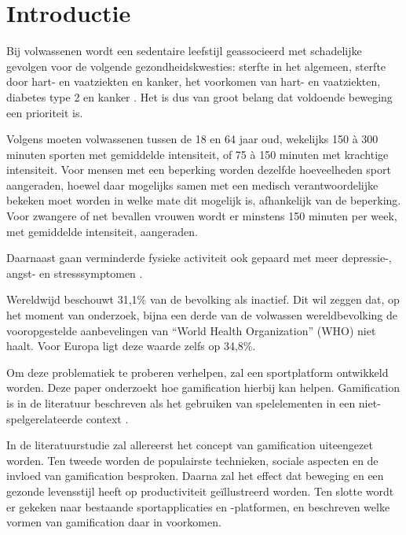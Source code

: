 
\section{Introductie}%
\label{sec:introductie}

Bij volwassenen wordt een sedentaire leefstijl geassocieerd met schadelijke gevolgen voor de volgende gezondheidskwesties: sterfte in het algemeen, sterfte door hart- en vaatziekten en kanker, het voorkomen van hart- en vaatziekten, diabetes type 2 en kanker \autocite{Bull2020}. Het is dus van groot belang dat voldoende beweging een prioriteit is.

Volgens \textcite{Bull2020} moeten volwassenen tussen de 18 en 64 jaar oud, wekelijks 150 à 300 minuten sporten met gemiddelde intensiteit, of 75 à 150 minuten met krachtige intensiteit. Voor mensen met een beperking worden dezelfde hoeveelheden sport aangeraden, hoewel daar mogelijks samen met een medisch verantwoordelijke bekeken moet worden in welke mate dit mogelijk is, afhankelijk van de beperking. Voor zwangere of net bevallen vrouwen wordt er minstens 150 minuten per week, met gemiddelde intensiteit, aangeraden.

Daarnaast gaan verminderde fysieke activiteit ook gepaard met meer depressie-, angst- en stresssymptomen \autocite{Stanton2020}.

Wereldwijd beschouwt \autocite{Hallal2012} 31,1\% van de bevolking als inactief. Dit wil zeggen dat, op het moment van onderzoek, bijna een derde van de volwassen wereldbevolking de vooropgestelde aanbevelingen van ``World Health Organization'' (WHO) niet haalt. Voor Europa ligt deze waarde zelfs op 34,8\%.

Om deze problematiek te proberen verhelpen, zal een sportplatform ontwikkeld worden. Deze paper onderzoekt hoe gamification hierbij kan helpen. Gamification is in de literatuur beschreven als het gebruiken van spelelementen in een niet-spelgerelateerde context \autocite{Gaalen2020}.


In de literatuurstudie zal allereerst het concept van gamification uiteengezet worden. Ten tweede worden de populairste technieken, sociale aspecten en de invloed van gamification besproken. Daarna zal het effect dat beweging en een gezonde levensstijl heeft op productiviteit geïllustreerd worden. Ten slotte wordt er gekeken naar bestaande sportapplicaties en -platformen, en beschreven welke vormen van gamification daar in voorkomen.

